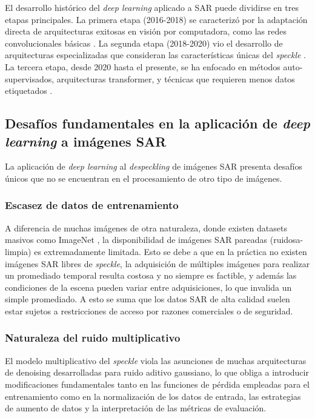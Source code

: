 El desarrollo histórico del \emph{deep learning} aplicado a SAR puede dividirse en tres etapas principales. La primera etapa (2016-2018) se caracterizó por la adaptación directa de arquitecturas exitosas en visión por computadora, como las redes convolucionales básicas \cite{chierchia2017sar}. La segunda etapa (2018-2020) vio el desarrollo de arquitecturas especializadas que consideran las características únicas del \emph{speckle} \cite{cozzolino2020nonlocal}. La tercera etapa, desde 2020 hasta el presente, se ha enfocado en métodos auto-supervisados, arquitecturas transformer, y técnicas que requieren menos datos etiquetados \cite{dalsasso2021sar2sar}.

\subsection{Desafíos fundamentales en la aplicación de \emph{deep learning} a imágenes SAR}

La aplicación de \emph{deep learning} al \emph{despeckling} de imágenes SAR presenta desafíos únicos que no se encuentran en el procesamiento de otro tipo de imágenes.

\subsubsection{Escasez de datos de entrenamiento}

A diferencia de muchas imágenes de otra naturaleza, donde existen datasets masivos como ImageNet \cite{deng2009imagenet}, la disponibilidad de imágenes SAR pareadas (ruidosa-limpia) es extremadamente limitada. Esto se debe a que en la práctica no existen imágenes SAR libres de \emph{speckle}, la adquisición de múltiples imágenes para realizar un promediado temporal resulta costosa y no siempre es factible, y además las condiciones de la escena pueden variar entre adquisiciones, lo que invalida un simple promediado. A esto se suma que los datos SAR de alta calidad suelen estar sujetos a restricciones de acceso por razones comerciales o de seguridad.

\subsubsection{Naturaleza del ruido multiplicativo}

El modelo multiplicativo del \emph{speckle} viola las asunciones de muchas arquitecturas de denoising desarrolladas para ruido aditivo gaussiano, lo que obliga a introducir modificaciones fundamentales tanto en las funciones de pérdida empleadas para el entrenamiento como en la normalización de los datos de entrada, las estrategias de aumento de datos y la interpretación de las métricas de evaluación.

